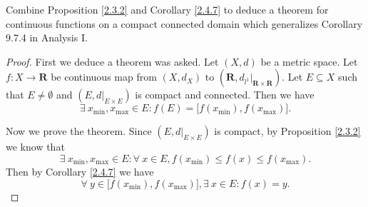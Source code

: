 \begin{exercise}\label{ex 2.4.10}
    Combine Proposition \ref{2.3.2} and Corollary \ref{2.4.7} to deduce a theorem for continuous functions on a compact connected domain which generalizes Corollary 9.7.4 in Analysis I.
\end{exercise}

\begin{proof}
    First we deduce a theorem was asked.
    Let \((X, d)\) be a metric space.
    Let \(f : X \to \mathbf{R}\) be continuous map from \((X, d_X)\) to \((\mathbf{R}, d_{l^1}|_{\mathbf{R} \times \mathbf{R}})\).
    Let \(E \subseteq X\) such that \(E \neq \emptyset\) and \((E, d|_{E \times E})\) is compact and connected.
    Then we have
    \[
        \exists\ x_{\min}, x_{\max} \in E : f(E) = \big[f(x_{\min}), f(x_{\max})\big].
    \]

    Now we prove the theorem.
    Since \((E, d|_{E \times E})\) is compact, by Proposition \ref{2.3.2} we know that
    \[
        \exists\ x_{\min}, x_{\max} \in E : \forall\ x \in E, f(x_{\min}) \leq f(x) \leq f(x_{\max}).
    \]
    Then by Corollary \ref{2.4.7} we have
    \[
        \forall\ y \in \big[f(x_{\min}), f(x_{\max})\big], \exists\ x \in E : f(x) = y.
    \]
\end{proof}